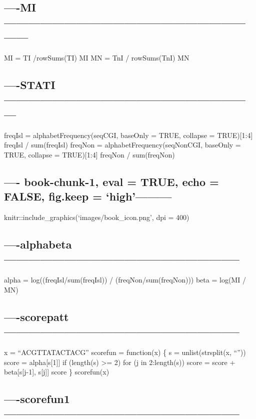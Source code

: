 \documentclass[]{article}
\begin{document}
\subsection{----MI------------------------------------------------------------------}\label{mi}

MI = TI /rowSums(TI) MI MN = TnI / rowSums(TnI) MN

\subsection{----STATI---------------------------------------------------------------}\label{stati}

freqIsl = alphabetFrequency(seqCGI, baseOnly = TRUE, collapse =
TRUE){[}1:4{]} freqIsl / sum(freqIsl) freqNon =
alphabetFrequency(seqNonCGI, baseOnly = TRUE, collapse = TRUE){[}1:4{]}
freqNon / sum(freqNon)

\subsection{\texorpdfstring{---- book-chunk-1, eval = TRUE, echo =
FALSE, fig.keep =
`high'---------}{---- book-chunk-1, eval = TRUE, echo = FALSE, fig.keep = high---------}}\label{book-chunk-1-eval-true-echo-false-fig.keep-high}

knitr::include\_graphics(`images/book\_icon.png', dpi = 400)

\subsection{----alphabeta-----------------------------------------------------------}\label{alphabeta}

alpha = log((freqIsl/sum(freqIsl)) / (freqNon/sum(freqNon))) beta =
log(MI / MN)

\subsection{----scorepatt-----------------------------------------------------------}\label{scorepatt}

x = ``ACGTTATACTACG'' scorefun = function(x) \{ s = unlist(strsplit(x,
``'')) score = alpha{[}s{[}1{]}{]} if (length(s) \textgreater{}= 2) for
(j in 2:length(s)) score = score + beta{[}s{[}j-1{]}, s{[}j{]}{]} score
\} scorefun(x)

\subsection{----scorefun1-----------------------------------------------------------}\label{scorefun1}
\end{document}
